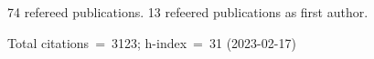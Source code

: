 74 refereed publications. 13 refeered publications as first author.

Total citations~=~3123; h-index~=~31 (2023-02-17)